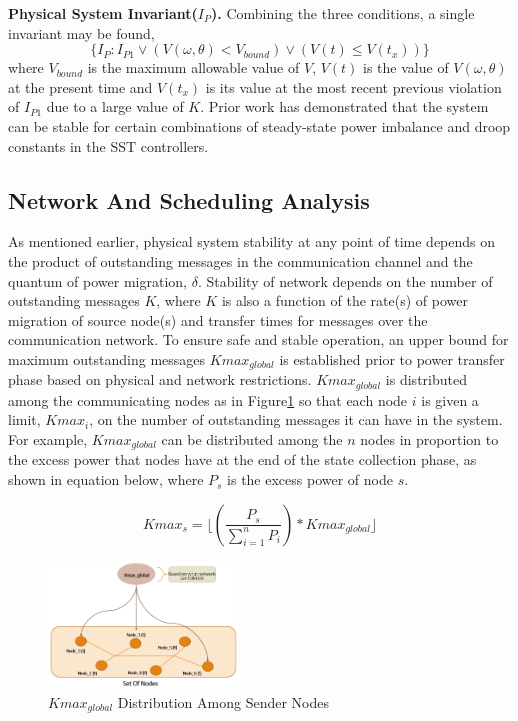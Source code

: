 {\bf Physical System Invariant($I_P$).}
Combining the three conditions, a single invariant may be found,
\begin{equation}
  \{I_P : I_{P1} \lor (V(\omega, \theta) < V_{bound}) \lor (V(t) \leq V(t_{x}))\}
  \label{eqn:IP}
\end{equation}
where $V_{bound}$ is the maximum allowable value of $V$, $V(t)$ is the value of
$V(\omega, \theta)$ at the present time and $V(t_{x})$ is its value at the most
recent previous violation of $I_{P1}$ due to a large value of $K$. Prior work
\cite{paul2011,paul12thesis} has demonstrated that the system can be stable for 
certain combinations of steady-state power imbalance and droop constants in 
the SST controllers.
 
\subsection{Network And Scheduling Analysis} 

As mentioned earlier, physical system stability at any point of time depends on the product of outstanding 
messages in the communication channel and the quantum of power migration, $\delta$.
Stability of network depends on the number of outstanding messages $K$, where $K$ is
also a function of the rate(s) of power migration of source node(s) and transfer times for
messages over the communication network. To ensure safe and stable operation, an upper 
bound for maximum outstanding messages $Kmax_{global}$ is established prior to power
transfer phase based on physical and network restrictions. $Kmax_{global}$ is distributed
among the communicating nodes as in Figure\ref{fig:Kmax_distribution} so that each node 
$i$ is given a limit, $Kmax_i$, on the number of outstanding messages it can have in the
system. For example, $Kmax_{global}$ can be distributed among the $n$ nodes in proportion to the excess
power that nodes have at the end of the state collection phase, as shown in equation below,
where $P_s$ is the excess power of node $s$. 

\begin{equation}
Kmax_s = \lfloor(\frac{P_s}{\sum_{i=1}^{n} P_i}) * Kmax_{global}\rfloor
\label{eq:kmax_distrib}
\end{equation}

\begin{figure}[htb]
  \begin{center}
    \includegraphics[width=0.45\textwidth]{Figures/kmax_distri.png}
  \caption{$Kmax_{global}$ Distribution Among Sender Nodes}
  \label{fig:Kmax_distribution}
  \end{center}
\end{figure}

